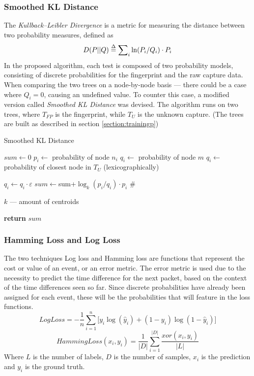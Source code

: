 \documentclass[9pt,journal,compsoc]{IEEEtran}
\makeatletter
\def\NoNumber#1{{\def\alglinenumber##1{}\State #1}\addtocounter{ALG@line}{-1}}
\newcommand\LONGCOMMENT[1]{%
  \hfill\#\ \begin{minipage}[t]{\eqboxwidth{COMMENT}}#1\strut\end{minipage}%
}
\makeatother
\begin{document}
\subsubsection{Smoothed KL Distance}
The \emph{Kullback--Leibler Divergence} is a metric for measuring the distance between two probability measures, defined as 
\begin{equation}\label{eq:kld}
D(P||Q) \buildrel \Delta \over = \sum\nolimits_i {\ln ({P_i}/{Q_i}) \cdot {P_i}}
\end{equation}
In the proposed algorithm, each test is composed of two probability models, consisting of discrete probabilities for the fingerprint and the raw capture data. When comparing the two trees on a node-by-node basis --- there could be a case where $Q_i=0$, causing an undefined value.
To counter this case, a modified version called \emph{Smoothed KL Distance} was devised.
The algorithm runs on two trees, where $T_{FP}$ is the fingerprint, while $T_U$ is the unknown capture.
(The trees are built as described in section \ref{section:trainingp})
\begin{algorithm}
\caption{Smoothed KL Distance}\label{kld}
\begin{algorithmic}[1]
\State $sum\gets0$
      \State $p_i\gets$ probability of node $n_i$
      	\State $q_i\gets$ probability of node $m$
      \Else
      	\State $q_i\gets$ probability of closest node in $T_U$ \NoNumber{(lexicographically)}
      	\State $q_i\gets q_i\cdot\varepsilon$
      \EndIf
   \State$sum\gets 
   $sum+$ \log_k (p_i/q_i) \cdot {p_i}$\LONGCOMMENT{$k$ --- amount of centroids}
   \EndFor\label{euclidendwhile}
   \State \textbf{return} $sum$
\EndProcedure
\end{algorithmic}
\end{algorithm}
\subsubsection{Hamming Loss and Log Loss}
The two techniques Log loss \cite{Bis06} and Hamming loss \cite{Tso07, Ham50} are functions that represent the cost or value of an event, or an error metric.
The error metric is used due to the necessity to predict the time difference for the next packet, based on the context of the time differences seen so far.
Since discrete probabilities have already been assigned for each event, these will be the probabilities that will feature in the loss functions.
\begin{equation}\label{eq:ll}
LogLoss =  - \frac{1}{n}\sum\limits_{i = 1}^n {[{y_i}\log ({{\hat y}_i}) + (1 - {y_i})\log } (1 - {\hat y_i})]
\end{equation}
\begin{equation}\label{eq:hl}
HammingLoss({x_i},{y_i}) = \frac{1}{{\left| D \right|}}\sum\limits_{i = 1}^{\left| D \right|} {\frac{{xor({x_i},{y_i})}}{{\left| L \right|}}}
\end{equation}
Where $L$ is the number of labels, $D$ is the number of samples, $x_i$ is the prediction and $y_i$ is the ground truth.
\end{document}
